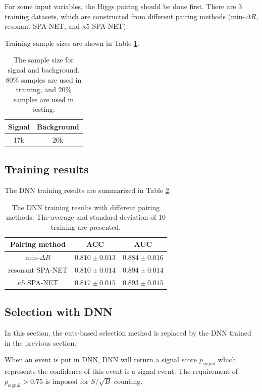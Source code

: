 \documentclass[12pt]{article}
\begin{document}
		For some input variables, the Higgs pairing should be done first. There are 3 training datasets, which are constructed from different pairing methods ($\text{min-}\Delta R$, resonant SPA-NET, and $\kappa 5$ SPA-NET).

		Training sample sizes are shown in Table \ref{tab:DNN_sample_size}.
		\begin{table}[htpb]
			\centering
			\caption{The sample size for signal and background. 80\% samples are used in training, and 20\% samples are used in testing.}
			\label{tab:DNN_sample_size}
			\begin{tabular}{c|c}
			 Signal & Background\\ \hline
			 17k      & 20k      
			\end{tabular}
		\end{table}

	\subsection{Training results}%
	\label{sub:training_results}
		The DNN training results are summarized in Table \ref{tab:DNN_results}.
		\begin{table}[htpb]
			\centering
			\caption{The DNN training results with different pairing methods. The average and standard deviation of 10 training are presented.}
			\label{tab:DNN_results}
			\begin{tabular}{c|cc}
			Pairing method        & ACC     & AUC   \\ \hline
			$\text{min-}\Delta R$ & $0.810 \pm 0.013$ & $0.884 \pm 0.016$ \\
			resonant SPA-NET      & $0.810 \pm 0.014$ & $0.894 \pm 0.014$ \\
			$\kappa 5$ SPA-NET    & $0.817 \pm 0.015$ & $0.893 \pm 0.015$
			\end{tabular}      
		\end{table}
	
	\subsection{Selection with DNN}%
	\label{sub:selection_with_dnn}
	In this section, the cuts-based selection method is replaced by the DNN trained in the previous section. 

	When an event is put in DNN, DNN will return a signal score $p_{\text{signal}}$ which represents the confidence of this event is a signal event. The requirement of $p_{\text{signal}} > 0.75$ is imposed for $S / \sqrt{B}$ counting.
\end{document}
